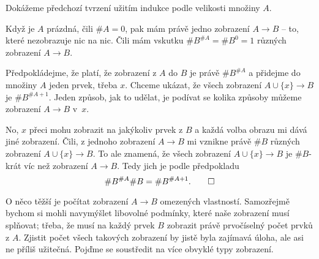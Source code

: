 \begin{enhproof}
 Dokážeme předchozí tvrzení užitím indukce podle velikosti množiny $A$.

 Když je $A$ prázdná, čili $\# A = 0$, pak mám právě jedno zobrazení $A \to B$
 -- to, které nezobrazuje nic na nic. Čili mám vskutku $\# B^{\# A} = \# B^{0} =
 1$ různých zobrazení $A \to B$.

 Předpokládejme, že platí, že zobrazení z $A$ do $B$ je právě $\# B^{\# A}$ a
 přidejme do množiny $A$ jeden prvek, třeba $x$. Chceme ukázat, že všech
 zobrazení $A \cup \{x\} \to B$ je $\# B^{\# A + 1}$. Jeden způsob, jak to
 udělat, je podívat se kolika způsoby můžeme zobrazení $A \to B$
  v~$x$.

 No, $x$ přeci mohu zobrazit na jakýkoliv prvek z $B$ a každá volba obrazu mi
 dává jiné zobrazení. Čili, z jednoho zobrazení $A \to B$ mi vznikne právě $\#
 B$ různých zobrazení $A \cup \{x\} \to B$. To ale znamená, že všech zobrazení
 $A \cup \{x\} \to B$ je $\# B$-krát víc než zobrazení $A \to B$. Tedy jich je
 podle předpokladu
 \[
  \# B^{\# A}\# B = \# B^{\#A + 1}.\qedhere
 \]
\end{enhproof}

O něco těžší je počítat zobrazení $A \to B$ omezených vlastností. Samozřejmě
bychom si mohli navymýšlet libovolné podmínky, které naše zobrazení musí
splňovat; třeba, že musí na každý prvek $B$ zobrazit právě prvočíselný počet
prvků z $A$. Zjistit počet všech takových zobrazení by jistě byla zajímavá
úloha, ale asi ne příliš užitečná. Pojďme se soustředit na více obvyklé typy
zobrazení.

